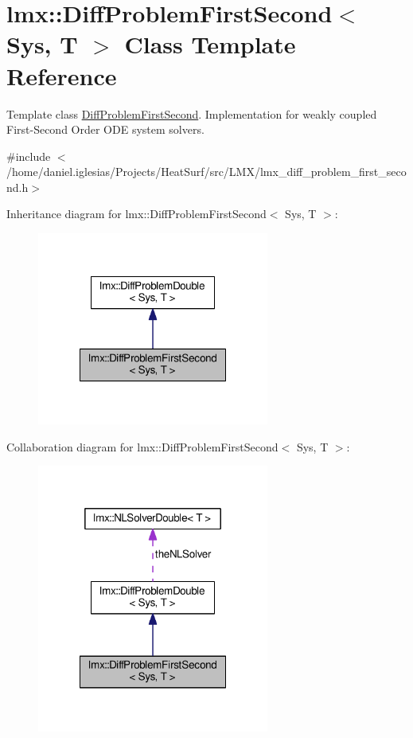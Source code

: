 \hypertarget{classlmx_1_1DiffProblemFirstSecond}{\section{lmx\-:\-:Diff\-Problem\-First\-Second$<$ Sys, T $>$ Class Template Reference}
\label{classlmx_1_1DiffProblemFirstSecond}
}


Template class \hyperlink{classlmx_1_1DiffProblemFirstSecond}{Diff\-Problem\-First\-Second}. Implementation for weakly coupled First-\/\-Second Order O\-D\-E system solvers.  




{\ttfamily \#include $<$/home/daniel.\-iglesias/\-Projects/\-Heat\-Surf/src/\-L\-M\-X/lmx\-\_\-diff\-\_\-problem\-\_\-first\-\_\-second.\-h$>$}



Inheritance diagram for lmx\-:\-:Diff\-Problem\-First\-Second$<$ Sys, T $>$\-:
\nopagebreak
\begin{figure}[H]
\begin{center}
\leavevmode
\includegraphics[width=216pt]{classlmx_1_1DiffProblemFirstSecond__inherit__graph}
\end{center}
\end{figure}


Collaboration diagram for lmx\-:\-:Diff\-Problem\-First\-Second$<$ Sys, T $>$\-:
\nopagebreak
\begin{figure}[H]
\begin{center}
\leavevmode
\includegraphics[width=216pt]{classlmx_1_1DiffProblemFirstSecond__coll__graph}
\end{center}
\end{figure}
